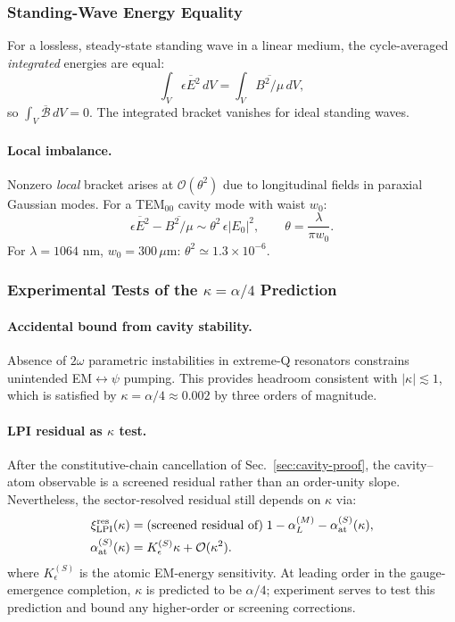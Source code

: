 \subsubsection{Standing-Wave Energy Equality}

For a lossless, steady-state standing wave in a linear medium, the cycle-averaged \textit{integrated} energies are equal:
\begin{equation}
\int_V \overline{\epsilon E^2}\,dV = \int_V \overline{B^2/\mu}\,dV,
\end{equation}
so $\int_V \overline{\mathcal{B}}\,dV = 0$. The integrated bracket vanishes for ideal standing waves.

\paragraph{Local imbalance.}
Nonzero \textit{local} bracket arises at $\mathcal{O}(\theta^2)$ due to longitudinal fields in paraxial Gaussian modes. For a TEM$_{00}$ cavity mode with waist $w_0$:
\begin{equation}
\overline{\epsilon E^2} - \overline{B^2/\mu} \sim \theta^2\,\epsilon|E_0|^2, \qquad \theta = \frac{\lambda}{\pi w_0}.
\end{equation}
For $\lambda = 1064$ nm, $w_0 = 300\,\mu$m: $\theta^2 \simeq 1.3 \times 10^{-6}$.

\subsubsection{Experimental Tests of the $\kappa = \alpha/4$ Prediction}

\paragraph{Accidental bound from cavity stability.}
Absence of $2\omega$ parametric instabilities in extreme-Q resonators constrains unintended EM$\leftrightarrow\psi$ pumping. This provides headroom consistent with $|\kappa| \lesssim 1$, which is satisfied by $\kappa = \alpha/4 \approx 0.002$ by three orders of magnitude.

\paragraph{LPI residual as $\kappa$ test.}
After the constitutive-chain cancellation of Sec.~\ref{sec:cavity-proof}, the cavity--atom observable is a screened residual rather than an order-unity slope.  Nevertheless, the sector-resolved residual still depends on $\kappa$ via:
\begin{align}
\xi_{\rm LPI}^{\rm res}(\kappa)
  &= \text{(screened residual of)}\;
     1 - \alpha_L^{(M)} - \alpha_{\rm at}^{(S)}(\kappa),
     \notag\\
\alpha_{\rm at}^{(S)}(\kappa)
  &= K_\epsilon^{(S)}\kappa + \mathcal{O}(\kappa^2).
\end{align}
where $K_\epsilon^{(S)}$ is the atomic EM-energy sensitivity.  At leading order in the gauge-emergence completion, $\kappa$ is predicted to be $\alpha/4$; experiment serves to test this prediction and bound any higher-order or screening corrections.

